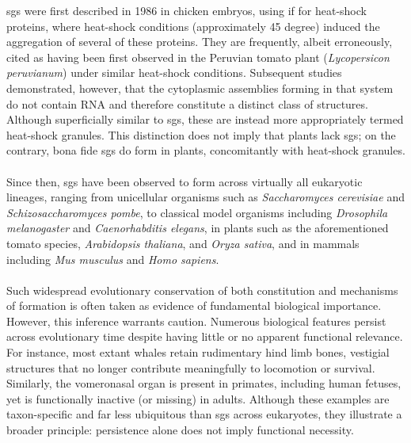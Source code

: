 \gls{sg}s were first described in 1986 in chicken embryos, using \gls{if} for heat-shock proteins, where heat-shock conditions (approximately 45 \gls{degree}) induced the aggregation of several of these proteins\cite{collier_dynamic_1986}. They are frequently, albeit erroneously, cited as having been first observed in the Peruvian tomato plant (\textit{Lycopersicon peruvianum}) under similar heat-shock conditions\cite{nover_formation_1983}. Subsequent studies demonstrated, however, that the cytoplasmic assemblies forming in that system do not contain RNA\cite{weber_plant_2008} and therefore constitute a distinct class of structures. Although superficially similar to \gls{sg}s, these are instead more appropriately termed heat-shock granules. This distinction does not imply that plants lack \glspl{sg}; on the contrary, bona fide \glspl{sg} do form in plants\cite{weber_plant_2008}, concomitantly with heat-shock granules\cite{weber_plant_2008}. 
\\
\\
Since then, \glspl{sg} have been observed to form across virtually all eukaryotic lineages, ranging from unicellular organisms such as \textit{Saccharomyces cerevisiae}\cite{hu_ssd1_2018} and \textit{Schizosaccharomyces pombe}\cite{zhang_fission_2025}, to classical model organisms including \textit{Drosophila melanogaster}\cite{van_leeuwen_identification_2022} and \textit{Caenorhabditis elegans}\cite{vidya_edc-3_2024}, in plants such as the aforementioned tomato species, \textit{Arabidopsis thaliana}\cite{chantarachot_dhh1ddx6-like_2020}, and \textit{Oryza sativa}\cite{zeng_viral_2025}, and in mammals including \textit{Mus musculus}\cite{namkoong_systematic_2018} and \textit{Homo sapiens}\cite{somasekharan_g3bp1-linked_2020}. 
\\
\\
Such widespread evolutionary conservation of both constitution and mechanisms of formation is often taken as evidence of fundamental biological importance. However, this inference warrants caution. Numerous biological features persist across evolutionary time despite having little or no apparent functional relevance. For instance, most extant whales retain rudimentary hind limb bones, vestigial structures that no longer contribute meaningfully to locomotion or survival\cite{bejder_limbs_2002}. Similarly, the vomeronasal organ is present in primates, including human fetuses, yet is functionally inactive (or missing) in adults\cite{won_vomeronasal_2000}. Although these examples are taxon-specific and far less ubiquitous than \glspl{sg} across eukaryotes, they illustrate a broader principle: persistence alone does not imply functional necessity.
